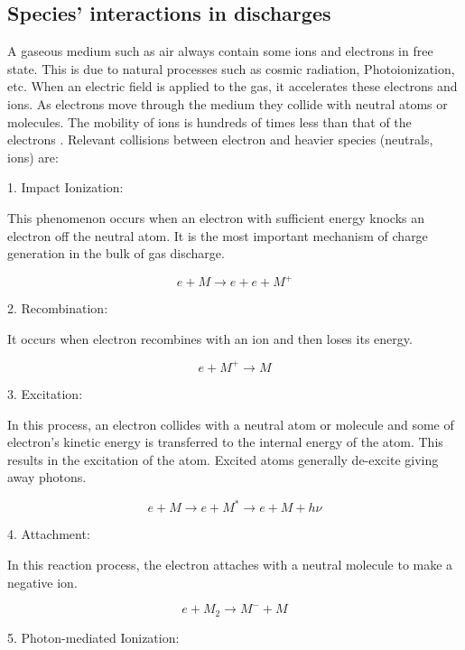 \documentclass[paper=a4, fontsize=13pt]{scrartcl}
\begin{document}
\subsection{Species' interactions in discharges}
A gaseous medium such as air always contain some ions and electrons in free state. This is due to natural processes such as cosmic radiation, Photoionization, etc. When an electric field is applied to the gas, it accelerates these electrons and ions. As electrons move through the medium they collide with neutral atoms or molecules. The mobility of ions is hundreds of times less than that of the electrons \cite{Raizer1991GasRazryada}. Relevant collisions between electron and heavier species (neutrals, ions) are:

1. Impact Ionization:

    This phenomenon occurs when an electron with sufficient energy knocks an electron off the neutral atom. It is the most important mechanism of charge generation in the bulk of gas discharge.
    
\begin{equation}
e + M \rightarrow e + e + M^+
\end{equation}


2. Recombination:

           It occurs when electron recombines with an ion and then loses its energy.

\begin{equation}
e + M^+ \rightarrow M
\end{equation}

3. Excitation:

           In this process, an electron collides with a neutral atom or molecule and some of electron's kinetic energy is transferred to the internal energy of the atom. This results in the excitation of the atom. Excited atoms generally de-excite giving away photons.

\begin{equation}
e + M \rightarrow e + M^* \rightarrow e + M + h\nu
\end{equation}

4. Attachment:

            In this reaction process, the electron attaches with a neutral molecule to make a negative ion.

\begin{equation}
e + M_2 \rightarrow M^- + M
\end{equation}

5. Photon-mediated Ionization:
\end{document}
